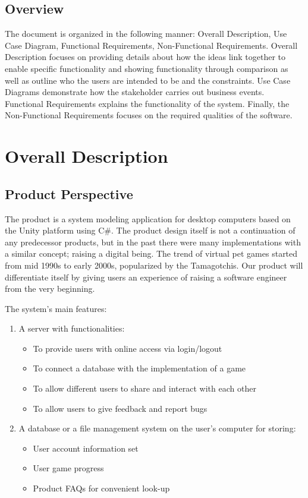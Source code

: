 \documentclass[]{article}
\begin{document}
\subsection{Overview}
\label{sub:overview}
The document is organized in the following manner: Overall Description, Use 
Case Diagram, Functional Requirements, Non-Functional Requirements. Overall 
Description focuses on providing details about how the ideas link together to 
enable specific functionality and showing functionality through comparison as 
well as outline who the users are intended to be and the constraints. Use Case 
Diagrams demonstrate how the stakeholder carries out business events. Functional 
Requirements explains the functionality of the system. Finally, the 
Non-Functional Requirements focuses on the required qualities of the software.


\section{Overall Description}
\label{sec:overall_description}

\subsection{Product Perspective}
\label{sub:product_perspective}
The product is a system modeling application for desktop computers based on the 
Unity platform using C\#. The product design itself is not a continuation of any 
predecessor products, but in the past there were many implementations with a 
similar concept; raising a digital being. The trend of virtual pet games started 
from mid 1990s to early 2000s, popularized by the Tamagotchis. Our product will 
differentiate itself by giving users an experience of raising a software engineer 
from the very beginning.

The system’s main features:
\begin{enumerate}[1)]
    \item A server with functionalities:
    \begin{itemize}
        \item To provide users with online access via login/logout
        \item To connect a database with the implementation of a game
        \item To allow different users to share and interact with each other
        \item To allow users to give feedback and report bugs
    \end{itemize}
    \item A database or a file management system on the user’s computer for 
    storing:
    \begin{itemize}
        \item User account information set
        \item User game progress
        \item Product FAQs for convenient look-up
    \end{itemize}
\end{enumerate}
\end{document}
